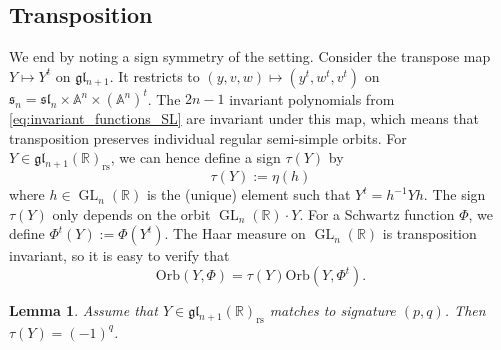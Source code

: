\documentclass[reqno, 11pt]{amsart} %
\numberwithin{equation}{section}
\theoremstyle{plain}
\newtheorem{lemma}[theorem]{Lemma}
\theoremstyle{definition}
\theoremstyle{remark}
\newcommand{\mr}{\mathrm}
\newcommand{\mbA}{\mathbb{A}}
\newcommand{\mbR}{\mathbb{R}}
\newcommand{\mfg}{\mathfrak{g}}
\newcommand{\mfl}{\mathfrak{l}}
\newcommand{\mfs}{\mathfrak{s}}
\newcommand{\rs}{\mr{rs}}
\newcommand{\mfgl}{\mfg\mfl}
\newcommand{\mfsl}{\mfs\mfl}
\newcommand{\bbR}{\mathbb R}
\newcommand{\lie}[1]{ \mathfrak{#1}}
\DeclareMathOperator{\GL}{GL}
\newcommand{\Orb}{\mathrm{Orb}}
\begin{document}
\subsection{Transposition}

We end by noting a sign symmetry of the setting. Consider the transpose map $Y\mapsto Y^t$ on $\mfgl_{n+1}$. It restricts to $(y, v, w) \mapsto (y^t, w^t, v^t)$ on $\lie s_n =\mfsl_n\times \mbA^n\times (\mbA^n)^t$. The $2n-1$ invariant polynomials from \eqref{eq:invariant_functions_SL} are invariant under this map, which means that transposition preserves individual regular semi-simple orbits. For $Y\in \mfgl_{n+1}(\mbR)_\rs$, we can hence define a sign $τ(Y)$ by
\begin{equation}
τ(Y) := η(h)
\end{equation}
where $h \in \GL_n(\bbR)$ is the (unique) element such that $Y^t = h^{-1} Y h$.
The sign $\tau(Y)$ only depends on the orbit $\GL_n(\mbR)\cdot Y$. For a Schwartz function $Φ$, we define $Φ^t(Y) := Φ(Y^t)$. The Haar measure on $\GL_n(\mbR)$ is transposition invariant, so it is easy to verify that
$$\Orb(Y, Φ) = τ(Y)\Orb(Y, Φ^t).$$
\begin{lemma}\label{lem:transposition}
Assume that $Y\in \mfgl_{n+1}(\mbR)_{\rs}$ matches to signature $(p,q)$. Then $τ(Y) = (-1)^q$.
\end{lemma}
\end{document}
